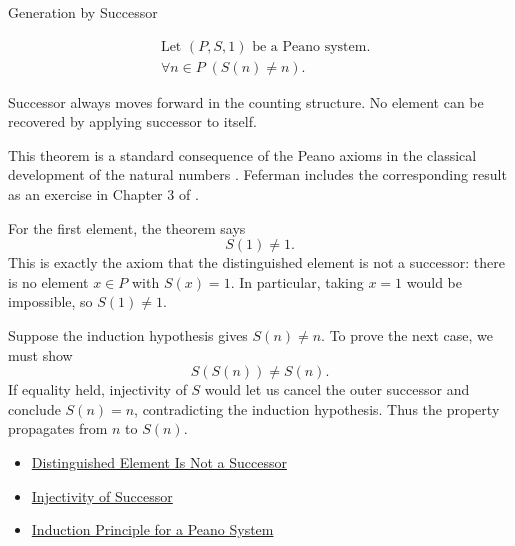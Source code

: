 \begin{topicbox}{Generation by Successor}
\begin{remark*}
\[
\begin{aligned}
&\text{Let } (P,S,1) \text{ be a Peano system.}\\
&\forall n \in P\;(S(n) \neq n).
\end{aligned}
\]
\end{remark*}

\begin{remark*}[Interpretation]
Successor always moves forward in the counting structure. No element can be
recovered by applying successor to itself.
\end{remark*}

\begin{remark*}
This theorem is a standard consequence of the Peano axioms in the classical
development of the natural numbers \citep{PeanoArithmeticesPrincipia1889}.
Feferman includes the corresponding result as an exercise in Chapter 3 of
\citet{FefermanNumberSystems1964}.
\end{remark*}

\begin{workedexample}
For the first element, the theorem says
\[
S(1)\neq 1.
\]
This is exactly the axiom that the distinguished element is not a successor:
there is no element $x\in P$ with $S(x)=1$. In particular, taking $x=1$
would be impossible, so $S(1)\neq 1$.
\end{workedexample}

\begin{workedexample}
Suppose the induction hypothesis gives $S(n)\neq n$. To prove the next case,
we must show
\[
S(S(n))\neq S(n).
\]
If equality held, injectivity of $S$ would let us cancel the outer successor
and conclude $S(n)=n$, contradicting the induction hypothesis. Thus the
property propagates from $n$ to $S(n)$.
\end{workedexample}

\begin{dependencies}
\begin{itemize}
  \item \hyperref[ax:peano-base-not-successor]{Distinguished Element Is Not a Successor}
  \item \hyperref[ax:peano-successor-injective]{Injectivity of Successor}
  \item \hyperref[thm:induction-principle-for-peano-system]{Induction Principle for a Peano System}
\end{itemize}
\end{dependencies}
\end{topicbox}


